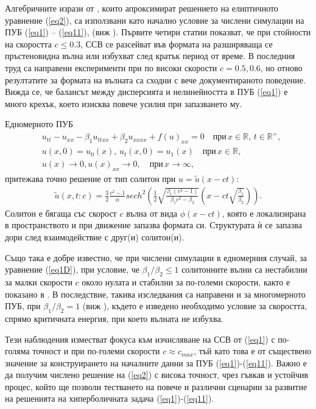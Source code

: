 \documentclass[a4paper]{article}
\newcommand{\rf}[1]{(\ref{#1})}
\newcommand{\RR}{\mathbb{R}}
\theoremstyle{remark}
\begin{document}
\begin{large}
Алгебричните изрази от \cite{ref15}, които апроксимират решението на елиптичното уравнение \rf{eq2}, са използвани като начално условие за числени симулации на ПУБ \rf{eq1} -- \rf{eq11}, 
(виж  \cite{ref21, ref20, ref23, ref22, ref24}). Първите четири статии показват, че при стойности на скоростта $c \le 0.3$, ССВ се разсейват във формата на разширяваща се пръстеновидна вълна или избухват след кратък период от време. В последния труд \cite{ref24} са направени експерименти при по високи скорости $c=0.5,0.6$, 
но отново резултатите за формата на вълната са сходни с вече документираното поведение. 
Вижда се, че балансът между дисперсията и нелинейността в ПУБ \rf{eq1} е много крехък, 
което изисква повече усилия при запазването му. 

Едномерното ПУБ
\begin{align}
&u_{tt} - u_{xx} -\beta_1  u_{ttxx} +\beta_2 u_{xxxx} + f(u)_{xx}=0   \quad \text{при} \,  x \in \RR, \, t\in\RR^+,\label{eq1D}
\\ \nonumber &u(x,0)=u_0(x), \, u_t(x,0)=u_1(x)   \quad\text{при} \, x \in \RR,
\\  &u(x) \rightarrow 0,  u(x)_{xx} \rightarrow 0 ,  \quad \text{при} \, x \rightarrow \infty, \label{eq1d1}
\end{align}
притежава точно решение от тип солитон при $u =\tilde u(x-ct)$:
\begin{align}
\tilde u(x,t:c) = \frac{3}{2} \frac{c^2-1}{\alpha}sech^2 \left( \frac{1}{2}  \sqrt{ \frac{\beta_1 (c^2-1)}{\beta_1 c^2-\beta_2}} (x-c t \sqrt{\frac{\beta_1}{\beta_2}} ) \right).
\end{align}
Солитон е бягаща със скорост $c$ вълна от вида $\phi(x-ct)$, която е локализирана в пространството и при движение запазва формата си. Структурата ѝ се запазва дори след взаимодействие с друг(и) солитон(и).

Също така е добре известно, 
че при числени симулации в едномерния случай, за уравнение \rf{eq1D}, при условие, че $\beta_1/\beta_2 \le 1$ солитонните вълни са нестабилни за малки скорости $c$ около нулата и стабилни за 
по-големи скорости, както е показано в \cite{ref10000}. В последствие, такива изследвания са направени и за многомерното ПУБ, при $\beta_1/\beta_2 = 1$ (виж \cite{ref1c0}), където е изведено необходимо условие за скоростта, спрямо критичната енергия, при което вълната не избухва.

Тези наблюдения изместват фокуса към изчисляване на ССВ от \rf{eq1} с по-голяма точност и при по-големи скорости $c \approx c_{max}$, тъй като това е от съществено значение за конструирането на началните данни за ПУБ \rf{eq1}-\rf{eq11}. Важно е да получим числено решение на \rf{eq2} с висока точност, чрез гъвкав и устойчив процес, който ще позволи тестването на повече и различни сценарии за развитие на решенията на хиперболичната задача \rf{eq1}-\rf{eq11}.


\end{large}
\end{document}
